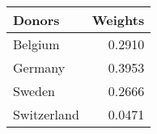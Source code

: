 \begin{tabular}{lr}
\toprule
     Donors &  Weights \\
\midrule
    Belgium &   0.2910 \\
    Germany &   0.3953 \\
     Sweden &   0.2666 \\
Switzerland &   0.0471 \\
\bottomrule
\end{tabular}
